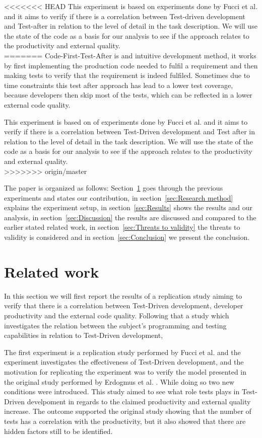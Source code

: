 \documentclass{sig-alternate-05-2015}
\begin{document}
<<<<<<< HEAD
This experiment is based on experiments done by Fucci et al. \cite{fucci2} and it aims to verify if there is a correlation between Test-driven development and Test-after in relation to the level of detail in the task description. We will use the state of the code as a basis for our analysis to see if the approach relates to the productivity and external quality.\\
=======
Code-First-Test-After is and intuitive development method, it works by first implementing the production code needed to fulfil a requirement and then making tests to verify that the requirement is indeed fulfiled. Sometimes due to time constraints this test after approach has lead to a lower test coverage, because developers then skip most of the tests, which can be reflected in a lower external code quality.

This experiment is based on of experiments done by Fucci et al. \cite{fucci2} and it aims to verify if there is a correlation between Test-Driven development and Test after in relation to the level of detail in the task description. We will use the state of the code as a basis for our analysis to see if the approach relates to the productivity and external quality.\\
>>>>>>> origin/master

The paper is organized as follows: Section~\ref{sec:Related work} goes through the previous experiments and states our contribution, in section~\ref{sec:Research method} explains the experiment setup, in section~\ref{sec:Results} shows the results and our analysis, in section~\ref{sec:Discussion} the results are discussed and compared to the earlier stated related work, in section~\ref{sec:Threats to validity} the threats to validity is considered and in section~\ref{sec:Conclusion} we present the conclusion. 

\section{Related work}
\label{sec:Related work}
In this section we will first report the results of a replication study aiming to verify that there is a correlation between Test-Driven development, developer productivity and the external code quality. Following that a study which investigates the relation between the subject's programming and testing capabilities in relation to Test-Driven development,

The first experiment is a replication study performed by  Fucci et al. \cite{fucci2} and the experiment investigates the effectiveness of Test-Driven development, and the motivation for replicating the experiment was to verify the model presented in the original study performed by Erdogmus et al. \cite{erdogmus1}. While doing so two new conditions were introduced. This study aimed to see what role tests plays in Test-Driven develpoment in regards to the claimed productivity and external quality increase. The outcome supported the original study showing that the number of tests has a correlation with the productivity, but it also showed that there are hidden factors still to be identified.
\end{document}
